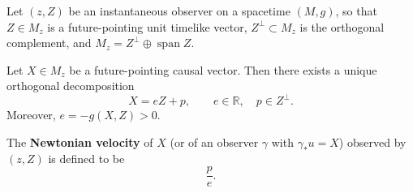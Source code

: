 Let $(z, Z)$ be an instantaneous observer on a spacetime $(M, g)$, so that $Z \in M_z$ is a future-pointing unit timelike vector, $Z^\perp \subset M_z$ is the orthogonal complement, and $M_z = Z^\perp \oplus \operatorname{span} Z$.

Let $X \in M_z$ be a future-pointing causal vector. Then there exists a unique orthogonal decomposition
$$X = eZ + p, \qquad e \in \mathbb{R}, \quad p \in Z^\perp.$$
Moreover, $e = -g(X, Z) > 0$.

The \textbf{Newtonian velocity} of $X$ (or of an observer $\gamma$ with $\gamma_* u = X$) observed by $(z, Z)$ is defined to be
$$\frac{p}{e}.$$
